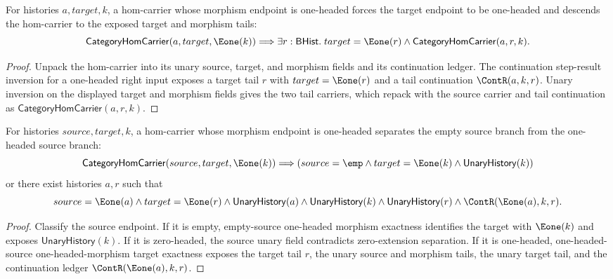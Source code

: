 \begin{theorem}
\label{thm:category-hom-carrier-one-headed-morphism-target-cases}
For histories $a,target,k$, a hom-carrier whose morphism endpoint is
one-headed forces the target endpoint to be one-headed and descends the
hom-carrier to the exposed target and morphism tails:
$$
\mathsf{CategoryHomCarrier}(a,target,\Eone(k))
\Longrightarrow
\exists r:\mathsf{BHist}.\;
target=\Eone(r)\land\mathsf{CategoryHomCarrier}(a,r,k).
$$
\end{theorem}
\begin{proof}
Unpack the hom-carrier into its unary source, target, and morphism fields and
its continuation ledger. The continuation step-result inversion for a
one-headed right input exposes a target tail $r$ with $target=\Eone(r)$ and a
tail continuation $\ContR(a,k,r)$. Unary inversion on the displayed target and
morphism fields gives the two tail carriers, which repack with the source
carrier and tail continuation as $\mathsf{CategoryHomCarrier}(a,r,k)$.
\end{proof}

\begin{theorem}
\label{thm:category-hom-carrier-e1-morphism-source-target-cases}
For histories $source,target,k$, a hom-carrier whose morphism endpoint is
one-headed separates the empty source branch from the one-headed source branch:
$$
\mathsf{CategoryHomCarrier}(source,target,\Eone(k))
\Longrightarrow
\left(
source=\emp\land target=\Eone(k)\land \mathsf{UnaryHistory}(k)
\right)
$$
or there exist histories $a,r$ such that
$$
source=\Eone(a)\land target=\Eone(r)\land
\mathsf{UnaryHistory}(a)\land\mathsf{UnaryHistory}(k)\land
\mathsf{UnaryHistory}(r)\land\ContR(\Eone(a),k,r).
$$
\end{theorem}
\begin{proof}
Classify the source endpoint. If it is empty, empty-source one-headed morphism
exactness identifies the target with $\Eone(k)$ and exposes
$\mathsf{UnaryHistory}(k)$. If it is zero-headed, the source unary field
contradicts zero-extension separation. If it is one-headed, one-headed-source
one-headed-morphism target exactness exposes the target tail $r$, the unary
source and morphism tails, the unary target tail, and the continuation ledger
$\ContR(\Eone(a),k,r)$.
\end{proof}

